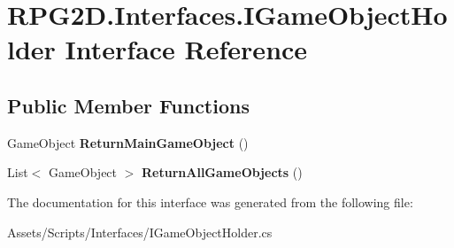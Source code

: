 \hypertarget{interface_r_p_g2_d_1_1_interfaces_1_1_i_game_object_holder}{}\section{R\+P\+G2\+D.\+Interfaces.\+I\+Game\+Object\+Holder Interface Reference}
\label{interface_r_p_g2_d_1_1_interfaces_1_1_i_game_object_holder}
\subsection*{Public Member Functions}
\begin{DoxyCompactItemize}
\item 
\mbox{\label{interface_r_p_g2_d_1_1_interfaces_1_1_i_game_object_holder_ab8c3a98986725f8a65db064b60ad3691}} 
Game\+Object {\bfseries Return\+Main\+Game\+Object} ()
\item 
\mbox{\label{interface_r_p_g2_d_1_1_interfaces_1_1_i_game_object_holder_ac2f4dffda0be3eba1eeac8eb9843b8b4}} 
List$<$ Game\+Object $>$ {\bfseries Return\+All\+Game\+Objects} ()
\end{DoxyCompactItemize}


The documentation for this interface was generated from the following file\+:\begin{DoxyCompactItemize}
\item 
Assets/\+Scripts/\+Interfaces/I\+Game\+Object\+Holder.\+cs\end{DoxyCompactItemize}
